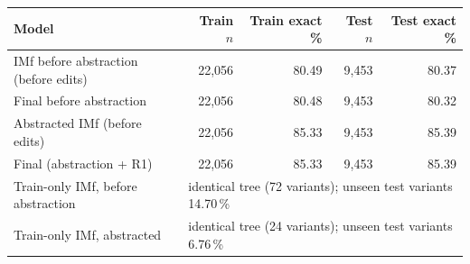 \begin{tabular}{lrrrr}
\hline
Model & Train $n$ & Train exact \% & Test $n$ & Test exact \% \\
\hline
IMf before abstraction (before edits) & 22,056 & 80.49 & 9,453 & 80.37 \\
Final before abstraction & 22,056 & 80.48 & 9,453 & 80.32 \\
Abstracted IMf (before edits) & 22,056 & 85.33 & 9,453 & 85.39 \\
Final (abstraction + R1) & 22,056 & 85.33 & 9,453 & 85.39 \\
\hline
Train-only IMf, before abstraction & \multicolumn{4}{l}{identical tree (72 variants); unseen test variants 14.70\,\%} \\
Train-only IMf, abstracted & \multicolumn{4}{l}{identical tree (24 variants); unseen test variants 6.76\,\%} \\
\hline
\end{tabular}
